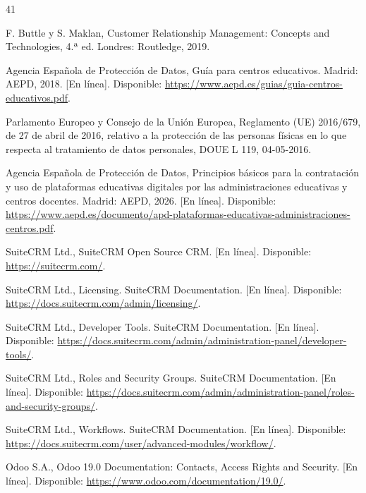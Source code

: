 

\begin{thebibliography}{41}

\raggedright

 F. Buttle y S. Maklan, Customer Relationship Management: Concepts and Technologies, 4.ª ed. Londres: Routledge, 2019.

 Agencia Española de Protección de Datos, Guía para centros educativos. Madrid: AEPD, 2018. [En línea]. Disponible: \url{https://www.aepd.es/guias/guia-centros-educativos.pdf}.

 Parlamento Europeo y Consejo de la Unión Europea, Reglamento (UE) 2016/679, de 27 de abril de 2016, relativo a la protección de las personas físicas en lo que respecta al tratamiento de datos personales, DOUE L 119, 04-05-2016.

 Agencia Española de Protección de Datos, Principios básicos para la contratación y uso de plataformas educativas digitales por las administraciones educativas y centros docentes. Madrid: AEPD, 2026. [En línea]. Disponible: \url{https://www.aepd.es/documento/apd-plataformas-educativas-administraciones-centros.pdf}.

 SuiteCRM Ltd., SuiteCRM Open Source CRM. [En línea]. Disponible: \url{https://suitecrm.com/}.

 SuiteCRM Ltd., Licensing. SuiteCRM Documentation. [En línea]. Disponible: \url{https://docs.suitecrm.com/admin/licensing/}.

 SuiteCRM Ltd., Developer Tools. SuiteCRM Documentation. [En línea]. Disponible: \url{https://docs.suitecrm.com/admin/administration-panel/developer-tools/}.

 SuiteCRM Ltd., Roles and Security Groups. SuiteCRM Documentation. [En línea]. Disponible: \url{https://docs.suitecrm.com/admin/administration-panel/roles-and-security-groups/}.

 SuiteCRM Ltd., Workflows. SuiteCRM Documentation. [En línea]. Disponible: \url{https://docs.suitecrm.com/user/advanced-modules/workflow/}.

 Odoo S.A., Odoo 19.0 Documentation: Contacts, Access Rights and Security. [En línea]. Disponible: \url{https://www.odoo.com/documentation/19.0/}.


\end{thebibliography}
